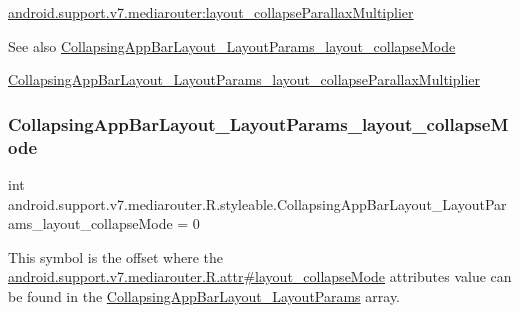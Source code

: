 {\ttfamily \hyperlink{classandroid_1_1support_1_1v7_1_1mediarouter_1_1R_1_1styleable_a19d2f8a3ce6aef7ab8239ffeffe31018}{android.\+support.\+v7.\+mediarouter\+:layout\+\_\+collapse\+Parallax\+Multiplier}}

\begin{DoxySeeAlso}{See also}
\hyperlink{classandroid_1_1support_1_1v7_1_1mediarouter_1_1R_1_1styleable_a3e5fbc3ee8d75862d538595291dd486d}{Collapsing\+App\+Bar\+Layout\+\_\+\+Layout\+Params\+\_\+layout\+\_\+collapse\+Mode} 

\hyperlink{classandroid_1_1support_1_1v7_1_1mediarouter_1_1R_1_1styleable_a19d2f8a3ce6aef7ab8239ffeffe31018}{Collapsing\+App\+Bar\+Layout\+\_\+\+Layout\+Params\+\_\+layout\+\_\+collapse\+Parallax\+Multiplier} 
\end{DoxySeeAlso}
\mbox{\label{classandroid_1_1support_1_1v7_1_1mediarouter_1_1R_1_1styleable_a3e5fbc3ee8d75862d538595291dd486d}} 
\subsubsection{\texorpdfstring{Collapsing\+App\+Bar\+Layout\+\_\+\+Layout\+Params\+\_\+layout\+\_\+collapse\+Mode}{CollapsingAppBarLayout\_LayoutParams\_layout\_collapseMode}}
{\footnotesize\ttfamily int android.\+support.\+v7.\+mediarouter.\+R.\+styleable.\+Collapsing\+App\+Bar\+Layout\+\_\+\+Layout\+Params\+\_\+layout\+\_\+collapse\+Mode = 0\hspace{0.3cm}{\ttfamily [static]}}

This symbol is the offset where the \hyperlink{classandroid_1_1support_1_1v7_1_1mediarouter_1_1R_1_1attr_a44d7e27bf5d67c11cc613491cfb7865c}{android.\+support.\+v7.\+mediarouter.\+R.\+attr\#layout\+\_\+collapse\+Mode} attribute\textquotesingle{}s value can be found in the \hyperlink{classandroid_1_1support_1_1v7_1_1mediarouter_1_1R_1_1styleable_a3a8fc0e8f0991d8f2645deeb9a8cfbb6}{Collapsing\+App\+Bar\+Layout\+\_\+\+Layout\+Params} array.

